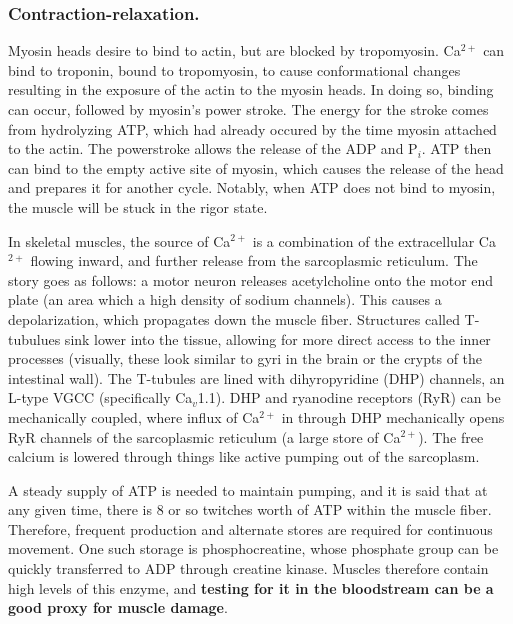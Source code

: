 \subsubsection{Contraction-relaxation.}
Myosin heads desire to bind to actin, but are blocked by tropomyosin. Ca$^{2+}$ can bind to troponin, bound to tropomyosin, to cause conformational changes resulting in the exposure of the actin to the myosin heads. In doing so, binding can occur, followed by myosin's power stroke. The energy for the stroke comes from hydrolyzing ATP, which had already occured by the time myosin attached to the actin. The powerstroke allows the release of the ADP and P$_i$. ATP then can bind to the empty active site of myosin, which causes the release of the head and prepares it for another cycle. Notably, when ATP does not bind to myosin, the muscle will be stuck in the rigor state.\newline

In skeletal muscles, the source of Ca$^{2+}$ is a combination of the extracellular Ca$^{2+}$ flowing inward, and further release from the sarcoplasmic reticulum. The story goes as follows: a motor neuron releases acetylcholine onto the motor end plate (an area which a high density of sodium channels). This causes a depolarization, which propagates down the muscle fiber. Structures called T-tubulues sink lower into the tissue, allowing for more direct access to the inner processes (visually, these look similar to gyri in the brain or the crypts of the intestinal wall). The T-tubules are lined with dihyropyridine (DHP) channels, an L-type VGCC (specifically Ca$_v$1.1). DHP and ryanodine receptors (RyR) can be mechanically coupled, where influx of Ca$^{2+}$ in through DHP mechanically opens RyR channels of the sarcoplasmic reticulum (a large store of Ca$^{2+}$). The free calcium is lowered through things like active pumping out of the sarcoplasm.\newline

A steady supply of ATP is needed to maintain pumping, and it is said that at any given time, there is 8 or so twitches worth of ATP within the muscle fiber. Therefore, frequent production and alternate stores are required for continuous movement. One such storage is phosphocreatine, whose phosphate group can be quickly transferred to ADP through creatine kinase. Muscles therefore contain high levels of this enzyme, and \textbf{testing for it in the bloodstream can be a good proxy for muscle damage}.\newline

